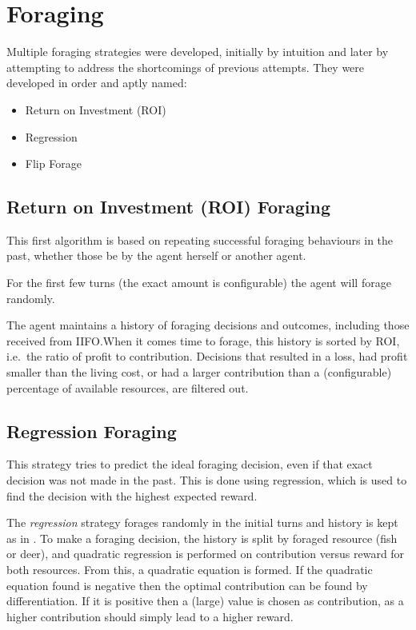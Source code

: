 \section{Foraging}
Multiple foraging strategies were developed, initially by intuition and later by attempting to address the shortcomings of previous attempts. They were developed in order and aptly named:
\begin{itemize}
    \item Return on Investment (ROI)
    \item Regression
    \item Flip Forage
\end{itemize}


\subsection{Return on Investment (ROI) Foraging}%
\label{sec:forage-roi}

This first algorithm is based on repeating successful foraging behaviours in the past, whether those be by the agent herself or another agent.

For the first few turns (the exact amount is configurable) the agent will forage randomly.

The agent maintains a history of foraging decisions and outcomes, including those received from IIFO.\@ When it comes time to forage, this history is sorted by ROI, i.e.\ the ratio of profit to contribution. Decisions that resulted in a loss, had profit smaller than the living cost, or had a larger contribution than a (configurable) percentage of available resources, are filtered out.

\subsection{Regression Foraging}%
\label{sec:forage-regression}

This strategy tries to predict the ideal foraging decision, even if that exact decision was not made in the past. This is done using regression, which is used to find the decision with the highest expected reward.

The \emph{regression} strategy forages randomly in the initial turns and history is kept as in . To make a foraging decision, the history is split by foraged resource (fish or deer), and quadratic regression is performed on contribution versus reward for both resources. From this, a quadratic equation is formed. If the quadratic equation found is negative then the optimal contribution can be found by differentiation. If it is positive then a (large) value is chosen as contribution, as a higher contribution should simply lead to a higher reward.

